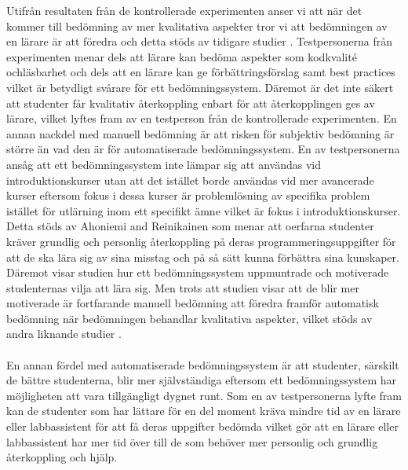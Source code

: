 \documentclass[a4paper,11pt]{article}
\begin{document}
{Utifrån resultaten från de kontrollerade experimenten anser vi att när det kommer till bedömning av mer kvalitativa aspekter tror vi att bedömningen av en lärare är att föredra och detta stöds av tidigare studier \cite{pieterse} \cite{ala-mutka} \cite{carter}. Testpersonerna från experimenten menar dels att lärare kan bedöma aspekter som kodkvalité ochläsbarhet och dels att en lärare kan ge förbättringsförslag samt best practices vilket är betydligt svårare för ett bedömningssystem. Däremot är det inte säkert att studenter får kvalitativ återkoppling enbart för att återkopplingen ges av lärare, vilket lyftes fram av en testperson från de kontrollerade experimenten. En annan nackdel med manuell bedömning är att risken för subjektiv bedömning är större än vad den är för automatiserade bedömningssystem. En av testpersonerna ansåg att ett bedömningssystem inte lämpar sig att användas vid introduktionskurser utan att det istället borde användas vid mer avancerade kurser eftersom fokus i dessa kurser är problemlösning av specifika problem istället för utlärning inom ett specifikt ämne vilket är fokus i introduktionskurser. Detta stöds av Ahoniemi and Reinikainen \cite{ahoniemi_aloha} som menar att oerfarna studenter kräver grundlig och personlig återkoppling på deras programmeringsuppgifter för att de ska lära sig av sina misstag och på så sätt kunna förbättra sina kunskaper. Däremot visar studien \cite{law_lee_yu} hur ett bedömningssystem uppmuntrade och motiverade studenternas vilja att lära sig. Men trots att studien visar att de blir mer motiverade är fortfarande manuell bedömning att föredra framför automatisk bedömning när bedömningen behandlar kvalitativa aspekter, vilket stöds av andra liknande studier \cite{pieterse} \cite{ala-mutka} \cite{carter}.
\\
\\
En annan fördel med automatiserade bedömningssystem är att studenter, särskilt de bättre studenterna, blir mer självständiga eftersom ett bedömningssystem har möjligheten att vara tillgängligt dygnet runt. Som en av testpersonerna lyfte fram kan de studenter som har lättare för en del moment kräva mindre tid av en lärare eller labbassistent för att få deras uppgifter bedömda vilket gör att en lärare eller labbassistent har mer tid över till de som behöver mer personlig och grundlig återkoppling och hjälp.
\\
\\
}
\end{document}
